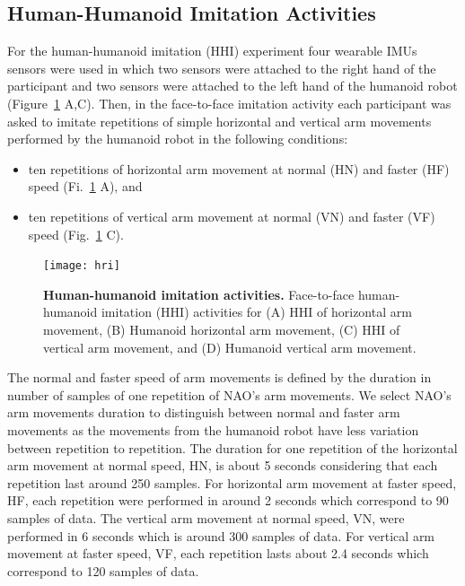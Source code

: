 \subsection{Human-Humanoid Imitation Activities} %
For the human-humanoid imitation (HHI) experiment four wearable IMUs sensors 
were used in which two sensors were attached to the right hand of 
the participant and two sensors were attached to the left hand of 
the humanoid robot (Figure~\ref{fig:hri} A,C).
Then, in the face-to-face imitation activity each participant was asked 
to imitate repetitions of simple horizontal and vertical arm movements 
performed by the humanoid robot in the following conditions:
\begin{itemize}[noitemsep,topsep=0pt]
\item ten repetitions of horizontal arm movement at normal (HN) and faster (HF) 
speed (Fi.~\ref{fig:hri} A), and
\item ten repetitions of vertical arm movement at normal (VN) and faster (VF) 
speed (Fig.~\ref{fig:hri} C).
\end{itemize}
\begin{figure}
  \centering
  \texttt{[image: hri]}
    \caption{
	{\bf Human-humanoid imitation activities.} 
		Face-to-face human-humanoid imitation (HHI) activities for 
		(A) HHI of horizontal arm movement, 
		(B) Humanoid horizontal arm movement,
		(C) HHI of vertical arm movement, and 
		(D) Humanoid vertical arm movement.
        }
    \label{fig:hri}
\end{figure}
The normal and faster speed of arm movements is defined by the duration in 
number of samples of one repetition of NAO's arm movements.
We select NAO's arm movements duration to distinguish between normal and 
faster arm movements as the movements from the humanoid robot have less 
variation between repetition to repetition. 
The duration for one repetition of the horizontal 
arm movement at normal speed, HN, is about 5 seconds considering that 
each repetition last around 250 samples. For horizontal arm movement at 
faster speed, HF, each repetition were performed in around 2 seconds 
which correspond to 90 samples of data. 
The vertical arm movement at normal speed, VN, were performed  in 6 seconds 
which is around 300 samples of data.
For vertical arm movement at faster speed, VF, each repetition lasts 
about 2.4 seconds which correspond to 120 samples of data.
